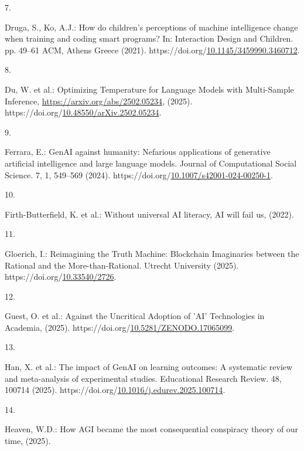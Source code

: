 \documentclass[
  letterpaper,
  DIV=11,
  numbers=noendperiod]{scrartcl}
\newlength{\cslhangindent}
\newlength{\csllabelwidth}
\newenvironment{CSLReferences}[2] %
 {\begin{list}{}{%
  \setlength{\itemindent}{0pt}
  \setlength{\leftmargin}{0pt}
  \setlength{\parsep}{0pt}
  \ifodd #1
   \setlength{\leftmargin}{\cslhangindent}
   \setlength{\itemindent}{-1\cslhangindent}
  \fi
  \setlength{\itemsep}{#2\baselineskip}}}
 {\end{list}}
\newcommand{\CSLLeftMargin}[1]{\parbox[t]{\csllabelwidth}{\strut#1\strut}}
\newcommand{\CSLRightInline}[1]{\parbox[t]{\linewidth - \csllabelwidth}{\strut#1\strut}}
\begin{document}
\begin{CSLReferences}{0}{0}
\CSLLeftMargin{7. }%
\CSLRightInline{Druga, S., Ko, A.J.: How do children's perceptions of
machine intelligence change when training and coding smart programs? In:
Interaction {Design} and {Children}. pp. 49--61 ACM, Athens Greece
(2021).
https://doi.org/\href{https://doi.org/10.1145/3459990.3460712}{10.1145/3459990.3460712}.}

\CSLLeftMargin{8. }%
\CSLRightInline{Du, W. et al.: Optimizing {Temperature} for {Language
Models} with {Multi-Sample Inference},
\url{https://arxiv.org/abs/2502.05234}, (2025).
https://doi.org/\href{https://doi.org/10.48550/arXiv.2502.05234}{10.48550/arXiv.2502.05234}.}

\CSLLeftMargin{9. }%
\CSLRightInline{Ferrara, E.: {GenAI} against humanity: Nefarious
applications of generative artificial intelligence and large language
models. Journal of Computational Social Science. 7, 1, 549--569 (2024).
https://doi.org/\href{https://doi.org/10.1007/s42001-024-00250-1}{10.1007/s42001-024-00250-1}.}

\CSLLeftMargin{10. }%
\CSLRightInline{Firth-Butterfield, K. et al.: Without universal {AI}
literacy, {AI} will fail us, (2022).}

\CSLLeftMargin{11. }%
\CSLRightInline{Gloerich, I.: Reimagining the {Truth Machine}:
{Blockchain Imaginaries} between the {Rational} and the
{More-than-Rational}. Utrecht University (2025).
https://doi.org/\href{https://doi.org/10.33540/2726}{10.33540/2726}.}

\CSLLeftMargin{12. }%
\CSLRightInline{Guest, O. et al.: Against the {Uncritical Adoption} of
'{AI}' {Technologies} in {Academia}, (2025).
https://doi.org/\href{https://doi.org/10.5281/ZENODO.17065099}{10.5281/ZENODO.17065099}.}

\CSLLeftMargin{13. }%
\CSLRightInline{Han, X. et al.: The impact of {GenAI} on learning
outcomes: {A} systematic review and meta-analysis of experimental
studies. Educational Research Review. 48, 100714 (2025).
https://doi.org/\href{https://doi.org/10.1016/j.edurev.2025.100714}{10.1016/j.edurev.2025.100714}.}

\CSLLeftMargin{14. }%
\CSLRightInline{Heaven, W.D.: How {AGI} became the most consequential
conspiracy theory of our time, (2025).}


\end{CSLReferences}
\end{document}
